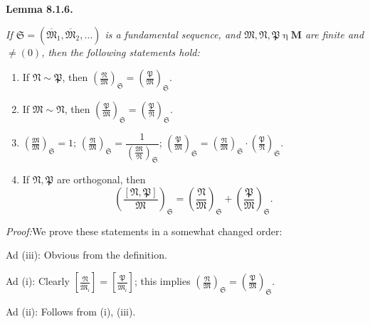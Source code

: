 \documentclass[12pt,b5paper,twoside]{article}
\newcommand{\M}{\mathbf M}
\newcommand{\reldiv}[2]{\left[\frac{#1}{#2}\right]}
\newcommand{\Lemma}[1]{%
  \par\smallskip\noindent\phantomsection\label{lem:#1}\textbf{Lemma #1.}\enspace
}
\newcommand{\Proof}{\par\noindent\textit{Proof:}\enspace}
\begin{document}
\Lemma{8.1.6}
{\itshape
If $\mathfrak S=(\overline{\mathfrak M}_1,\overline{\mathfrak M}_2,\ldots)$
is a fundamental sequence, and $\mathfrak M,\mathfrak N,\mathfrak P
\mathbin\eta\M$ are finite and $\ne(0)$, then the following statements hold:
\begin{enumerate}[label=(\roman*)]
\item If $\mathfrak N\sim\mathfrak P$, then
 $\left(\frac{\mathfrak N}{\mathfrak M}\right)_{\mathfrak S}
 =\left(\frac{\mathfrak P}{\mathfrak M}\right)_{\mathfrak S}$.
\item If $\mathfrak M\sim\mathfrak N$, then
 $\left(\frac{\mathfrak P}{\mathfrak M}\right)_{\mathfrak S}
 =\left(\frac{\mathfrak P}{\mathfrak N}\right)_{\mathfrak S}$.
\item
 $\left(\frac{\mathfrak M}{\mathfrak M}\right)_{\mathfrak S}=1$;
 $\left(\frac{\mathfrak N}{\mathfrak M}\right)_{\mathfrak S}
 =\dfrac{1}{\left(\frac{\mathfrak M}{\mathfrak N}\right)_{\mathfrak S}}$;
 $\left(\frac{\mathfrak P}{\mathfrak M}\right)_{\mathfrak S}
 =\left(\frac{\mathfrak N}{\mathfrak M}\right)_{\mathfrak S}
  \cdot\left(\frac{\mathfrak P}{\mathfrak N}\right)_{\mathfrak S}$.
\item If $\mathfrak N,\mathfrak P$ are orthogonal, then
\[
 \left(\frac{[\mathfrak N,\mathfrak P]}{\mathfrak M}\right)_{\mathfrak S}
 =\left(\frac{\mathfrak N}{\mathfrak M}\right)_{\mathfrak S}
 +\left(\frac{\mathfrak P}{\mathfrak M}\right)_{\mathfrak S}.
\]
\end{enumerate}}

\Proof We prove these statements in a somewhat changed order:

Ad (iii): Obvious from the definition.

Ad (i): Clearly
$\reldiv{\mathfrak N}{\overline{\mathfrak M}_i}
=\reldiv{\mathfrak P}{\overline{\mathfrak M}_i}$; this implies
$\left(\frac{\mathfrak N}{\mathfrak M}\right)_{\mathfrak S}
=\left(\frac{\mathfrak P}{\mathfrak M}\right)_{\mathfrak S}$.

Ad (ii): Follows from (i), (iii).
\end{document}
